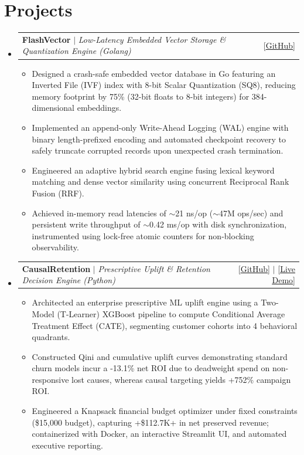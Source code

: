 \documentclass[letterpaper,10pt]{article}
\makeatletter
\newcommand{\resumeItem}[1]{
  \item\small{
    {#1 \vspace{-2pt}}
  }
}
\newcommand{\resumeProjectHeading}[2]{
  \vspace{-2pt}\item
    \begin{tabular*}{0.98\textwidth}{l@{\extracolsep{\fill}}r}
      #1 & #2 \\
    \end{tabular*}\vspace{-6pt}
}
\newcommand{\resumeSubHeadingListStart}{\begin{itemize}[leftmargin=0.15in, label={}]}
\newcommand{\resumeSubHeadingListEnd}{\end{itemize}}
\newcommand{\resumeItemListStart}{\begin{itemize}[leftmargin=0.15in]}
\newcommand{\resumeItemListEnd}{\end{itemize}\vspace{-4pt}}
\makeatother
\begin{document}
\section{Projects}
    \resumeSubHeadingListStart
      \resumeProjectHeading
          {\textbf{FlashVector} $|$ \emph{Low-Latency Embedded Vector Storage \& Quantization Engine (Golang)}}{[\href{https://github.com/yourprofile/flashvector}{\underline{GitHub}}]}
          \resumeItemListStart
            \resumeItem{Designed a crash-safe embedded vector database in Go featuring an Inverted File (IVF) index with 8-bit Scalar Quantization (SQ8), reducing memory footprint by 75\% (32-bit floats to 8-bit integers) for 384-dimensional embeddings.}
            \resumeItem{Implemented an append-only Write-Ahead Logging (WAL) engine with binary length-prefixed encoding and automated checkpoint recovery to safely truncate corrupted records upon unexpected crash termination.}
            \resumeItem{Engineered an adaptive hybrid search engine fusing lexical keyword matching and dense vector similarity using concurrent Reciprocal Rank Fusion (RRF).}
            \resumeItem{Achieved in-memory read latencies of $\sim$21 ns/op ($\sim$47M ops/sec) and persistent write throughput of $\sim$0.42 ms/op with disk synchronization, instrumented using lock-free atomic counters for non-blocking observability.}
          \resumeItemListEnd

      \resumeProjectHeading
          {\textbf{CausalRetention} $|$ \emph{Prescriptive Uplift \& Retention Decision Engine (Python)}}{[\href{https://github.com/yourprofile/CausalRetention}{\underline{GitHub}}] $|$ [\href{https://causal-retention.streamlit.app}{\underline{Live Demo}}]}
          \resumeItemListStart
            \resumeItem{Architected an enterprise prescriptive ML uplift engine using a Two-Model (T-Learner) XGBoost pipeline to compute Conditional Average Treatment Effect (CATE), segmenting customer cohorts into 4 behavioral quadrants.}
            \resumeItem{Constructed Qini and cumulative uplift curves demonstrating standard churn models incur a -13.1\% net ROI due to deadweight spend on non-responsive lost causes, whereas causal targeting yields +752\% campaign ROI.}
            \resumeItem{Engineered a Knapsack financial budget optimizer under fixed constraints (\$15,000 budget), capturing +\$112.7K+ in net preserved revenue; containerized with Docker, an interactive Streamlit UI, and automated executive reporting.}
          \resumeItemListEnd
    \resumeSubHeadingListEnd
\end{document}
